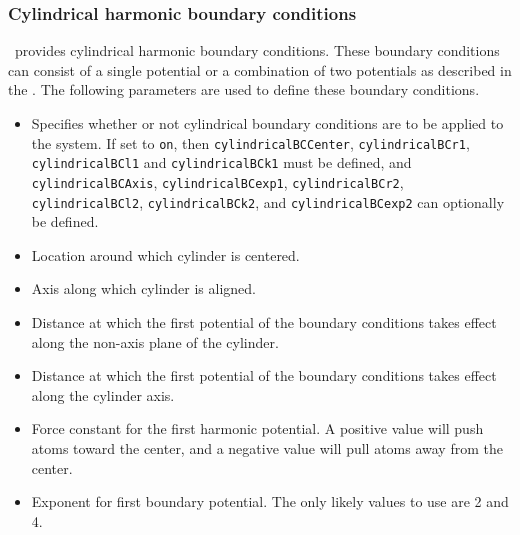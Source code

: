 \subsubsection{Cylindrical harmonic boundary conditions}

\NAMD\ provides cylindrical harmonic boundary conditions.  These 
boundary conditions can consist of a single potential or a 
combination of two potentials as described in the \PG.  
The following parameters are used to define these boundary conditions.  

\begin{itemize}

\item
{}
{Specifies whether or not cylindrical boundary conditions 
are to be applied to the system.  If 
set to {\tt on}, then {\tt cylindricalBCCenter}, {\tt cylindricalBCr1}, {\tt cylindricalBCl1} and {\tt cylindricalBCk1} 
must be defined, and {\tt cylindricalBCAxis}, {\tt cylindricalBCexp1}, {\tt cylindricalBCr2}, {\tt cylindricalBCl2},
{\tt cylindricalBCk2}, and {\tt cylindricalBCexp2} can optionally be 
defined.}

\item
{}
{Location around which cylinder is centered.}

\item
{}
{Axis along which cylinder is aligned.}

\item
{}
{Distance at which the first potential of the boundary conditions takes
effect along the non-axis plane of the cylinder.}

\item
{}
{Distance at which the first potential of the boundary conditions takes
effect along the cylinder axis.}

\item
{}
{Force constant for the first harmonic potential.  A positive
value will push atoms toward the center, and a negative
value will pull atoms away from the center.}

\item
{}
{Exponent for first boundary potential.  The only likely values to
use are 2 and 4.}


\end{itemize}
